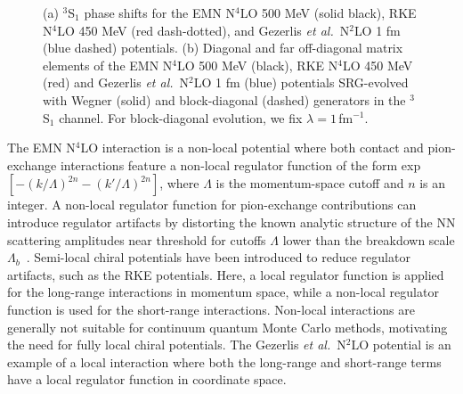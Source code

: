 \documentclass[10pt,aps,prc,floatfix,twocolumn,nofootinbib]{revtex4-1}
\begin{document}
%
\begin{figure}[tbh]
	\hfill
	\caption{(a) $^3$S$_1$ phase shifts for the EMN N$^4$LO 500 MeV (solid black), RKE N$^4$LO 450 MeV (red dash-dotted), and Gezerlis \textit{et al.}~N$^2$LO 1 fm (blue dashed) potentials. (b) Diagonal and far off-diagonal matrix elements of the EMN N$^4$LO 500 MeV (black), RKE N$^4$LO 450 MeV (red) and Gezerlis \textit{et al.}~N$^2$LO 1 fm (blue) potentials SRG-evolved with Wegner (solid) and block-diagonal (dashed) generators in the $^3$S$_1$ channel. For block-diagonal evolution, we fix $\lambda=1$\,fm$^{-1}$.}
	\label{fig:potential_universality_3S1}
\end{figure}
%

The EMN N$^4$LO interaction is a non-local potential where both contact and pion-exchange interactions feature a non-local regulator function of the form exp$[-(k/\Lambda)^{2n}-(k'/\Lambda)^{2n}]$, where $\Lambda$ is the momentum-space cutoff and $n$ is an integer. 
A non-local regulator function for pion-exchange contributions can introduce regulator artifacts by distorting the known analytic structure of the NN scattering amplitudes near threshold for cutoffs $\Lambda$ lower than the breakdown scale $\Lambda_b$~\cite{Epelbaum:2014efa}.
Semi-local chiral potentials have been introduced to reduce regulator artifacts, such as the RKE potentials.
Here, a local regulator function is applied for the long-range interactions in momentum space, while a non-local regulator function is used for the short-range interactions.
Non-local interactions are generally not suitable for continuum quantum Monte Carlo methods, motivating the need for fully local chiral potentials.
The Gezerlis \textit{et al.}~N$^2$LO potential is an example of a local interaction where both the long-range and short-range terms have a local regulator function in coordinate space.
\end{document}
